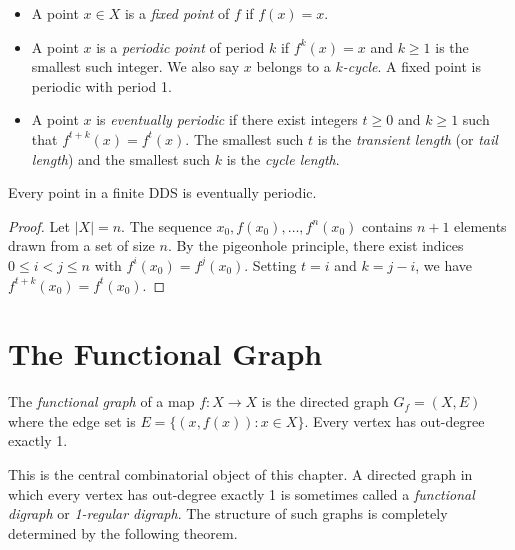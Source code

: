 \begin{definition}
\begin{itemize}
\item A point $x \in X$ is a \textit{fixed point} of $f$ if $f(x) = x$.
\item A point $x$ is a \textit{periodic point} of period $k$ if $f^k(x) = x$ and $k \geq 1$ is the smallest such integer. We also say $x$ belongs to a \textit{$k$-cycle}. A fixed point is periodic with period 1.
\item A point $x$ is \textit{eventually periodic} if there exist integers $t \geq 0$ and $k \geq 1$ such that $f^{t+k}(x) = f^t(x)$. The smallest such $t$ is the \textit{transient length} (or \textit{tail length}) and the smallest such $k$ is the \textit{cycle length}.
\end{itemize}
\end{definition}

\begin{proposition}
Every point in a finite DDS is eventually periodic.


\end{proposition}

\begin{proof}
Let $|X| = n$. The sequence $x_0, f(x_0), \ldots, f^n(x_0)$ contains $n+1$ elements drawn from a set of size $n$. By the pigeonhole principle, there exist indices $0 \leq i < j \leq n$ with $f^i(x_0) = f^j(x_0)$. Setting $t = i$ and $k = j - i$, we have $f^{t+k}(x_0) = f^t(x_0)$. 

\end{proof}

\section{The Functional Graph}

\begin{definition}
The \textit{functional graph} of a map $f: X \to X$ is the directed graph $G_f = (X, E)$ where the edge set is $E = \{ (x, f(x)) : x \in X\} $. Every vertex has out-degree exactly 1.

This is the central combinatorial object of this chapter. A directed graph in which every vertex has out-degree exactly 1 is sometimes called a \textit{functional digraph} or \textit{1-regular digraph}. The structure of such graphs is completely determined by the following theorem.
\end{definition}

